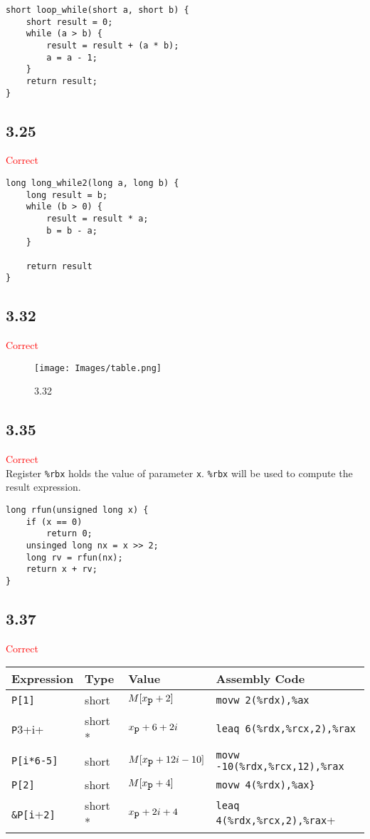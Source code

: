 \begin{verbatim}
short loop_while(short a, short b) {
    short result = 0;
    while (a > b) {
        result = result + (a * b);
        a = a - 1;
    }
    return result;
}
\end{verbatim}

\subsection*{3.25}
\textcolor{red}{Correct}
\begin{verbatim}
long long_while2(long a, long b) {
    long result = b;
    while (b > 0) {
        result = result * a;
        b = b - a;
    }
    
    return result
}
\end{verbatim}

\clearpage
\subsection*{3.32}
\textcolor{red}{Correct}
\begin{figure}[!ht]
    \centering
    \texttt{[image: Images/table.png]}
    \caption{3.32}
\end{figure}

\subsection*{3.35}
\textcolor{red}{Correct}\\
Register \verb+%rbx+ holds the value of parameter \verb+x+. \verb+%rbx+ will be used to compute the result expression.
\begin{verbatim}
long rfun(unsigned long x) {
    if (x == 0)
        return 0;
    unsinged long nx = x >> 2;
    long rv = rfun(nx);
    return x + rv;
}
\end{verbatim}

\clearpage
\subsection*{3.37}
\textcolor{red}{Correct}\\
\begin{tabular}{llll}
Expression   & Type    & Value              & Assembly Code                                       \\
\hline
\verb+P[1]+             & short   & $M[x_{\verb+p+}+2]$      & \verb+movw 2(%rdx),%ax+            \\
\verb+P+3+i+            & short * & $x_{\verb+p+}+6+2i$      & \verb+leaq 6(%rdx,%rcx,2),%rax+    \\
\verb+P[i*6-5]+         & short   & $M[x_{\verb+p+}+12i-10]$ & \verb+movw -10(%rdx,%rcx,12),%rax+ \\
\verb+P[2]+             & short   & $M[x_{\verb+p+}+4]$      & \verb+movw 4(%rdx),%ax}+           \\
\verb+&P[i++\verb+2]+   & short * & $x_{\verb+p+}+2i+4$      & \verb+leaq 4(%rdx,%rcx,2),%rax+
\end{tabular}

